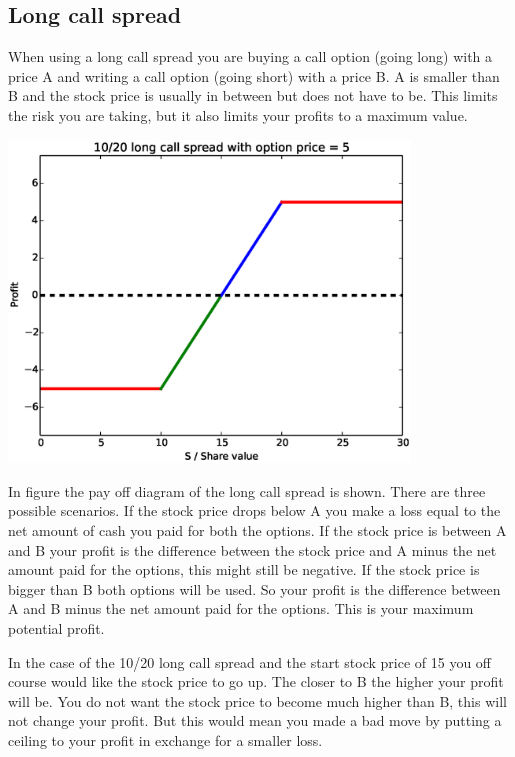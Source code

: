 \documentclass[8 pt]{article}
\newenvironment{Figure}
  {\par\medskip\noindent\minipage{\linewidth}}
  {\endminipage\par\medskip}
\begin{document}
\begin{multicols*}{2}
\section{Long call spread}
When using a long call spread you are buying a call option (going long) with a price A and writing a call option (going short) with a price B. A is smaller than B and the stock price is usually in between but does not have to be. This limits the risk you are taking, but it also limits your profits to a maximum value.
\begin{Figure}
  \begin{center}
    \includegraphics[width=0.8\textwidth]{graphs/long_call_option.eps}
    \label{fig:long_call_option}
  \end{center}
\end{Figure}
In figure the pay off diagram of the long call spread is shown. There are three possible scenarios. If the stock price drops below A you make a loss equal to the net amount of cash you paid for both the options. If the stock price is between A and B your profit is the difference between the stock price and A minus the net amount paid for the options, this might still be negative. If the stock price is bigger than B both options will be used. So your profit is the difference between A and B minus the net amount paid for the options. This is your maximum potential profit. 

In the case of the 10/20 long call spread and the start stock price of 15 you off course would like the stock price to go up. The closer to B the higher your profit will be. You do not want the stock price to become much higher than B, this will not change your profit. But this would mean you made a bad move by putting a ceiling to your profit in exchange for a smaller loss.

\end{multicols*}
\end{document}
